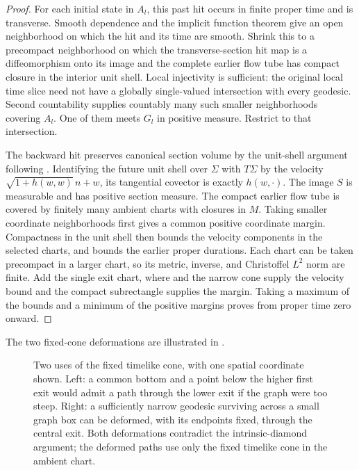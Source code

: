 \begin{proof}
For each initial state in $A_l$, this past hit occurs in
finite proper time and is transverse.  Smooth dependence and
the implicit function theorem give an open neighborhood on
which the hit and its time are smooth.  Shrink this to a
precompact neighborhood on which the transverse-section hit
map is a diffeomorphism onto its image and the complete
earlier flow tube has compact closure in the interior unit
shell.  Local injectivity is sufficient: the original local
time slice need not have a globally single-valued intersection
with every geodesic.  Second countability supplies countably
many such smaller neighborhoods covering $A_l$.  One of them
meets $G_l$ in positive measure.  Restrict to that intersection.

The backward hit preserves canonical section volume by the
unit-shell argument following .
Identifying the future unit shell over $\Sigma$ with
$T\Sigma$ by the velocity
$\sqrt{1+h(w,w)}\,n+w$, its tangential covector is exactly
$h(w,\cdot)$.  The image $S$ is measurable and has positive
section measure.  The compact earlier flow tube is covered
by finitely many ambient charts with closures in $M$.
Taking smaller coordinate neighborhoods first gives a common
positive coordinate margin.  Compactness in the unit shell
then bounds the velocity components in the selected charts,
and bounds the earlier proper durations.  Each chart can be
taken precompact in a larger chart, so its metric, inverse,
and Christoffel $L^2$ norm are finite.  Add the single exit
chart, where  and the narrow cone supply
the velocity bound and the compact subrectangle supplies the
margin.  Taking a maximum of the bounds and a minimum of the
positive margins proves  from proper
time zero onward.
\end{proof}

The two fixed-cone deformations are illustrated in .

\begin{figure}[htbp]
 \centering
 
 \caption{Two uses of the fixed timelike cone, with one spatial
 coordinate shown.  Left: a common bottom and a point below the
 higher first exit would admit a path through the lower exit if
 the graph were too steep.  Right: a sufficiently narrow
 geodesic surviving across a small graph box can be deformed,
 with its endpoints fixed, through the central exit.  Both
 deformations contradict the intrinsic-diamond argument; the
 deformed paths use only the fixed timelike cone in the ambient chart.}
 \label{ex:figure}
\end{figure}

